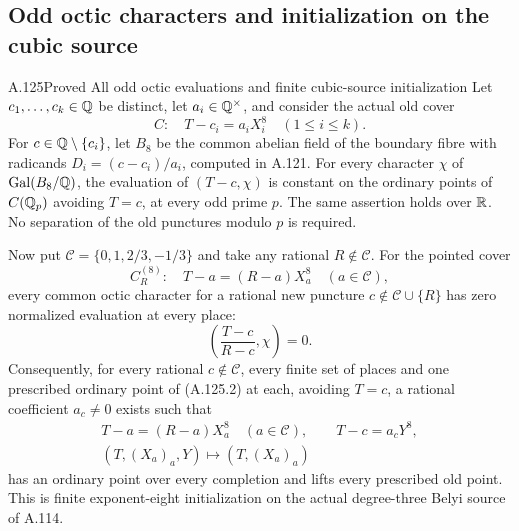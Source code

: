 \subsection{Odd octic characters and initialization on the cubic source}

\begin{statement}{A.125}{Proved}
{All odd octic evaluations and finite cubic-source initialization}
Let $c_1,\ldots,c_k\in\mathbb Q$ be distinct, let
$a_i\in\mathbb Q^\times$, and consider the actual old cover
\[
              C:\quad T-c_i=a_iX_i^8\quad(1\le i\le k).
\tag{A.125.1}
\]
For $c\in\mathbb Q\setminus\{c_i\}$, let $B_8$ be the common
abelian field of the boundary fibre with radicands
$D_i=(c-c_i)/a_i$, computed in A.121.
For every character $\chi$ of $\operatorname{Gal}(B_8/\mathbb Q)$,
the evaluation of $(T-c,\chi)$ is constant on the ordinary
points of $C(\mathbb Q_p)$ avoiding $T=c$, at every odd prime $p$.
The same assertion holds over $\mathbb R$.
No separation of the old punctures modulo $p$ is required.

Now put $\mathcal C=\{0,1,2/3,-1/3\}$ and take any
rational $R\notin\mathcal C$.
For the pointed cover
\[
       C_R^{(8)}:\quad T-a=(R-a)X_a^8
                                      \quad(a\in\mathcal C),
\tag{A.125.2}
\]
every common octic character for a rational new puncture
$c\notin\mathcal C\cup\{R\}$ has zero normalized
evaluation at every place:
\[
                 \left(\frac{T-c}{R-c},\chi\right)=0.
\tag{A.125.3}
\]
Consequently, for every rational $c\notin\mathcal C$,
every finite set of places and one prescribed ordinary
point of (A.125.2) at each, avoiding $T=c$, a rational
coefficient $a_c\ne0$ exists such that
\[
 \begin{gathered}
 T-a=(R-a)X_a^8\quad(a\in\mathcal C),\qquad
 T-c=a_cY^8,\\
        (T,(X_a)_a,Y)\longmapsto(T,(X_a)_a)
 \end{gathered}
\tag{A.125.4}
\]
has an ordinary point over every completion and lifts
every prescribed old point.
This is finite exponent-eight initialization on the
actual degree-three Belyi source of A.114.
\end{statement}
